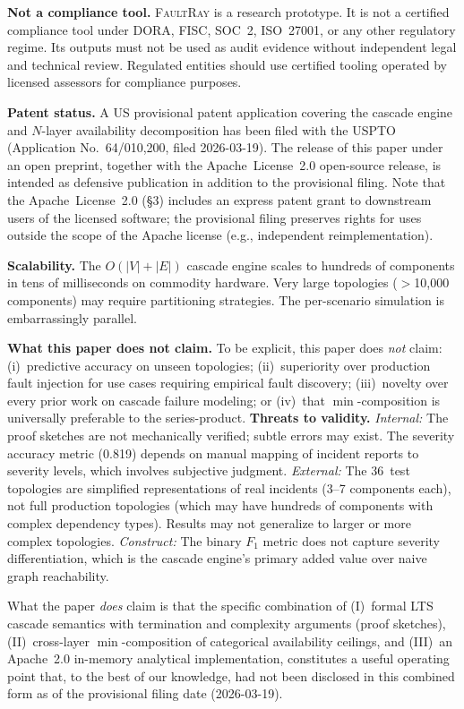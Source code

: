\documentclass[10pt,twocolumn]{article}
\begin{document}
\textbf{Not a compliance tool.}
\textsc{FaultRay} is a research prototype. It is not a certified
compliance tool under DORA, FISC, SOC~2, ISO~27001, or any other
regulatory regime. Its outputs must not be used as audit evidence
without independent legal and technical review. Regulated entities
should use certified tooling operated by licensed assessors for
compliance purposes.

\textbf{Patent status.}
A US provisional patent application covering the cascade engine and
$N$-layer availability decomposition has been filed with the USPTO
(Application No.~64/010,200, filed 2026-03-19). The release of this
paper under an open preprint, together with the Apache~License~2.0
open-source release, is intended as defensive publication in
addition to the provisional filing. Note that the Apache~License~2.0
(\S3) includes an express patent grant to downstream users of the
licensed software; the provisional filing preserves rights for
uses outside the scope of the Apache license (e.g., independent
reimplementation).

\textbf{Scalability.}
The $O(|V| + |E|)$ cascade engine scales to hundreds of components
in tens of milliseconds on commodity hardware. Very large
topologies ($>$10{,}000 components) may require partitioning
strategies. The per-scenario simulation is embarrassingly parallel.

\textbf{What this paper does not claim.}
To be explicit, this paper does \emph{not} claim:
(i)~predictive accuracy on unseen topologies;
(ii)~superiority over production fault injection for use cases
requiring empirical fault discovery;
(iii)~novelty over every prior work on cascade failure modeling; or
(iv)~that $\min$-composition is universally preferable to the
series-product.
\textbf{Threats to validity.}
\emph{Internal:} The proof sketches are not mechanically verified;
subtle errors may exist. The severity accuracy metric (0.819)
depends on manual mapping of incident reports to severity levels,
which involves subjective judgment.
\emph{External:} The 36~test topologies are simplified
representations of real incidents (3--7 components each), not
full production topologies (which may have hundreds of components
with complex dependency types). Results may not generalize to
larger or more complex topologies.
\emph{Construct:} The binary $F_1$ metric does not capture
severity differentiation, which is the cascade engine's primary
added value over naive graph reachability.

What the paper \emph{does} claim is that the specific combination of
(I)~formal LTS cascade semantics with termination and complexity
arguments (proof sketches), (II)~cross-layer $\min$-composition of categorical
availability ceilings, and (III)~an Apache~2.0 in-memory analytical
implementation, constitutes a useful operating point that, to the
best of our knowledge, had not been disclosed in this combined form
as of the provisional filing date (2026-03-19).
\end{document}

